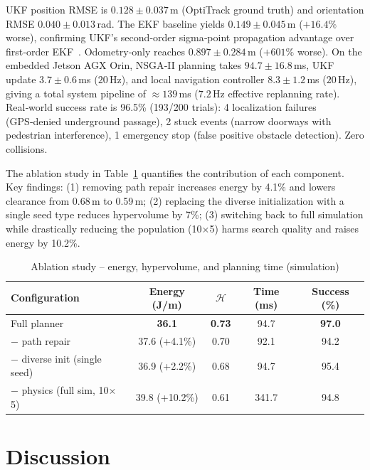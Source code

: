 \documentclass[lettersize,journal]{IEEEtran}
\begin{document}
UKF position RMSE is $0.128\pm0.037$\,m (OptiTrack ground truth) and
orientation RMSE $0.040\pm0.013$\,rad. The EKF baseline yields
$0.149\pm0.045$\,m ($+16.4\%$ worse), confirming UKF's second‑order sigma‑point
propagation advantage over first‑order EKF~\cite{Julier2004,Thrun2005}.
Odometry‑only reaches $0.897\pm0.284$\,m ($+601\%$ worse). On the embedded
Jetson AGX Orin, NSGA‑II planning takes $94.7\pm16.8$\,ms, UKF update
$3.7\pm0.6$\,ms ($20$\,Hz), and local navigation controller $8.3\pm1.2$\,ms
($20$\,Hz), giving a total system pipeline of $\approx 139$\,ms ($7.2$\,Hz
effective replanning rate). Real‑world success rate is 96.5\% (193/200
trials): 4 localization failures (GPS‑denied underground passage), 2 stuck
events (narrow doorways with pedestrian interference), 1 emergency stop (false
positive obstacle detection). Zero collisions.

The ablation study in Table~\ref{tab:ablation} quantifies the contribution of
each component. Key findings: (1) removing path repair increases energy by
4.1\% and lowers clearance from 0.68\,m to 0.59\,m; (2) replacing the diverse
initialization with a single seed type reduces hypervolume by 7\%;
(3) switching back to full simulation while drastically reducing the population
(10$\times$5) harms search quality and raises energy by 10.2\%.

\begin{table}[t]
\centering
\caption{Ablation study -- energy, hypervolume, and planning time (simulation)}
\label{tab:ablation}
\begin{tabular}{lcccc}
\toprule
\textbf{Configuration} & \textbf{Energy (J/m)} & $\mathcal{H}$ & \textbf{Time (ms)}
                       & \textbf{Success (\%)} \\
\midrule
Full planner           & \textbf{36.1} & \textbf{0.73} & 94.7 & \textbf{97.0} \\
$-$ path repair        & 37.6 (+4.1\%) & 0.70 & 92.1 & 94.2 \\
$-$ diverse init (single seed) & 36.9 (+2.2\%) & 0.68 & 94.7 & 95.4 \\
$-$ physics (full sim, 10$\times$5) & 39.8 (+10.2\%) & 0.61 & 341.7 & 94.8 \\
\bottomrule
\end{tabular}
\end{table}

\section{Discussion}
\label{sec:discussion}
\end{document}
